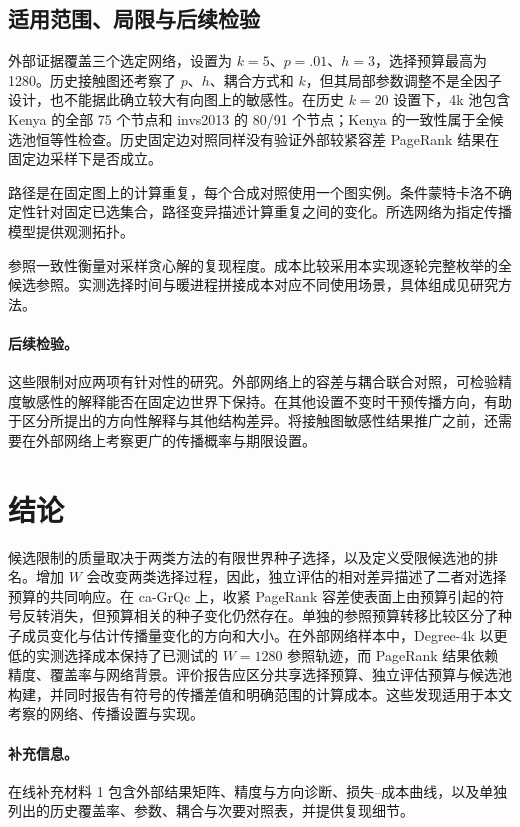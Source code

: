\documentclass[smallextended]{svjour3}
\begin{document}
\subsection{适用范围、局限与后续检验}
外部证据覆盖三个选定网络，设置为 $k=5$、$p=.01$、$h=3$，选择预算最高为 1280。历史接触图还考察了 $p$、$h$、耦合方式和 $k$，但其局部参数调整不是全因子设计，也不能据此确立较大有向图上的敏感性。在历史 $k=20$ 设置下，4k 池包含 Kenya 的全部 75 个节点和 invs2013 的 80/91 个节点；Kenya 的一致性属于全候选池恒等性检查。历史固定边对照同样没有验证外部较紧容差 PageRank 结果在固定边采样下是否成立。

路径是在固定图上的计算重复，每个合成对照使用一个图实例。条件蒙特卡洛不确定性针对固定已选集合，路径变异描述计算重复之间的变化。所选网络为指定传播模型提供观测拓扑。

参照一致性衡量对采样贪心解的复现程度。成本比较采用本实现逐轮完整枚举的全候选参照。实测选择时间与暖进程拼接成本对应不同使用场景，具体组成见研究方法。

\paragraph{后续检验。}这些限制对应两项有针对性的研究。外部网络上的容差与耦合联合对照，可检验精度敏感性的解释能否在固定边世界下保持。在其他设置不变时干预传播方向，有助于区分所提出的方向性解释与其他结构差异。将接触图敏感性结果推广之前，还需要在外部网络上考察更广的传播概率与期限设置。

\section{结论}
候选限制的质量取决于两类方法的有限世界种子选择，以及定义受限候选池的排名。增加 $W$ 会改变两类选择过程，因此，独立评估的相对差异描述了二者对选择预算的共同响应。在 ca-GrQc 上，收紧 PageRank 容差使表面上由预算引起的符号反转消失，但预算相关的种子变化仍然存在。单独的参照预算转移比较区分了种子成员变化与估计传播量变化的方向和大小。在外部网络样本中，Degree-4k 以更低的实测选择成本保持了已测试的 $W=1280$ 参照轨迹，而 PageRank 结果依赖精度、覆盖率与网络背景。评价报告应区分共享选择预算、独立评估预算与候选池构建，并同时报告有符号的传播差值和明确范围的计算成本。这些发现适用于本文考察的网络、传播设置与实现。

\paragraph{补充信息。}在线补充材料 1 包含外部结果矩阵、精度与方向诊断、损失--成本曲线，以及单独列出的历史覆盖率、参数、耦合与次要对照表，并提供复现细节。
\end{document}
